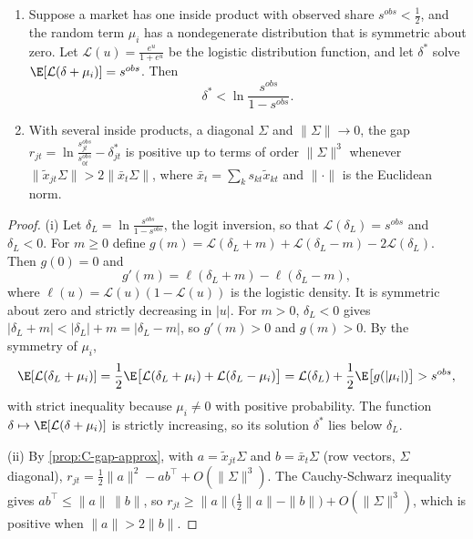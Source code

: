 \begin{proposition}\label{prop:C-delta-lower}
\begin{enumerate}[label=(\roman*)]
  \item Suppose a market has one inside product with observed share $s^{obs} < \frac{1}{2}$, and the random term
  $\mu_i$ has a nondegenerate distribution that is symmetric about zero. Let $\mathcal{L}(u) = \frac{e^u}{1 + e^u}$ be the logistic distribution function, and let
  $\delta^*$ solve $\E[\mathcal{L}(\delta + \mu_i)] = s^{obs}$. Then
  \[
    \delta^* < \ln\frac{s^{obs}}{1 - s^{obs}} .
  \]
  \item With several inside products, a diagonal $\Sigma$ and $\lVert\Sigma\rVert \to 0$, the gap
  $r_{jt} = \ln\frac{s^{obs}_{jt}}{s^{obs}_{0t}} - \delta^*_{jt}$ is positive up to terms of order $\lVert\Sigma\rVert^3$
  whenever $\|\tilde x_{jt}\Sigma\| > 2\|\bar x_t\Sigma\|$, where $\bar x_t = \sum_k s_{kt}\tilde x_{kt}$ and
  $\|\cdot\|$ is the Euclidean norm.
\end{enumerate}
\end{proposition}

\begin{proof}
(i) Let $\delta_L = \ln\frac{s^{obs}}{1 - s^{obs}}$, the logit inversion, so that $\mathcal{L}(\delta_L) = s^{obs}$ and
$\delta_L < 0$. For $m \ge 0$ define $g(m) = \mathcal{L}(\delta_L + m) + \mathcal{L}(\delta_L - m) - 2\mathcal{L}(\delta_L)$. Then
$g(0) = 0$ and
\[
  g'(m) = \ell(\delta_L + m) - \ell(\delta_L - m) ,
\]
where $\ell(u) = \mathcal{L}(u)(1 - \mathcal{L}(u))$ is the logistic density. It is symmetric about zero and strictly
decreasing in $|u|$. For $m > 0$, $\delta_L < 0$ gives $|\delta_L + m| < |\delta_L| + m = |\delta_L - m|$, so
$g'(m) > 0$ and $g(m) > 0$. By the symmetry of $\mu_i$,
\[
  \E[\mathcal{L}(\delta_L + \mu_i)] = \frac{1}{2}\E\big[\mathcal{L}(\delta_L + \mu_i) + \mathcal{L}(\delta_L - \mu_i)\big]
  = \mathcal{L}(\delta_L) + \frac{1}{2}\E\big[g(|\mu_i|)\big] > s^{obs} ,
\]
with strict inequality because $\mu_i \ne 0$ with positive probability. The function
$\delta \mapsto \E[\mathcal{L}(\delta + \mu_i)]$ is strictly increasing, so its solution $\delta^*$ lies below $\delta_L$.

(ii) By \cref{prop:C-gap-approx}, with $a = \tilde x_{jt}\Sigma$ and $b = \bar x_t\Sigma$ (row vectors, $\Sigma$ diagonal),
$r_{jt} = \frac{1}{2}\|a\|^2 - a b^\top + O(\lVert\Sigma\rVert^3)$. The Cauchy-Schwarz inequality gives $ab^\top \le \|a\|\,\|b\|$,
so $r_{jt} \ge \|a\|\big(\frac{1}{2}\|a\| - \|b\|\big) + O(\lVert\Sigma\rVert^3)$, which is positive when $\|a\| > 2\|b\|$.
\end{proof}

